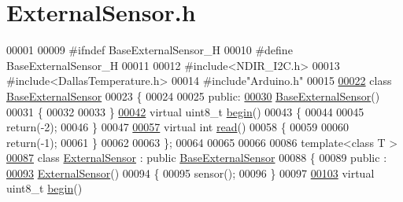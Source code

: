 \hypertarget{_external_sensor_8h_source}{}\section{External\+Sensor.\+h}

\begin{DoxyCode}
00001 
00009 \textcolor{preprocessor}{#ifndef BaseExternalSensor\_H}
00010 \textcolor{preprocessor}{#define BaseExternalSensor\_H}
00011 
00012 \textcolor{preprocessor}{#include<NDIR\_I2C.h>}
00013 \textcolor{preprocessor}{#include<DallasTemperature.h>}
00014 \textcolor{preprocessor}{#include"Arduino.h"}  
00015 
\hyperlink{class_base_external_sensor}{00022} \textcolor{keyword}{class }\hyperlink{class_base_external_sensor}{BaseExternalSensor}
00023 \{
00024 
00025 \textcolor{keyword}{public}:
\hyperlink{class_base_external_sensor_a978d96a6563b646efb358c2790a9fc6f}{00030}     \hyperlink{class_base_external_sensor_a978d96a6563b646efb358c2790a9fc6f}{BaseExternalSensor}()
00031     \{
00032     
00033     \}
\hyperlink{class_base_external_sensor_a87d132803d4f4fdd4e66332809f0c9a0}{00042}     \textcolor{keyword}{virtual} uint8\_t \hyperlink{class_base_external_sensor_a87d132803d4f4fdd4e66332809f0c9a0}{begin}()
00043     \{
00044 
00045         \textcolor{keywordflow}{return}(-2);
00046     \}
00047     
\hyperlink{class_base_external_sensor_a7e0a98f350148d7645031315657aa5ec}{00057}     \textcolor{keyword}{virtual} \textcolor{keywordtype}{int} \hyperlink{class_base_external_sensor_a7e0a98f350148d7645031315657aa5ec}{read}()
00058     \{
00059 
00060         \textcolor{keywordflow}{return}(-1);
00061     \}
00062     
00063 \};
00064 
00065 
00066 
00086 \textcolor{keyword}{template}<\textcolor{keyword}{class} T >
\hyperlink{class_external_sensor}{00087} \textcolor{keyword}{class }\hyperlink{class_external_sensor}{ExternalSensor} : \textcolor{keyword}{public} \hyperlink{class_base_external_sensor}{BaseExternalSensor}
00088 \{
00089 public :
\hyperlink{class_external_sensor_a8b991447fba33253103d06198b838751}{00093}     \hyperlink{class_external_sensor_a8b991447fba33253103d06198b838751}{ExternalSensor}()
00094     \{
00095         sensor();
00096     \}
00097 
\hyperlink{class_external_sensor_ab6fe1379d55b656a048e0fba1e0a32e6}{00103}     \textcolor{keyword}{virtual} uint8\_t \hyperlink{class_external_sensor_ab6fe1379d55b656a048e0fba1e0a32e6}{begin}()

\end{DoxyCode}
